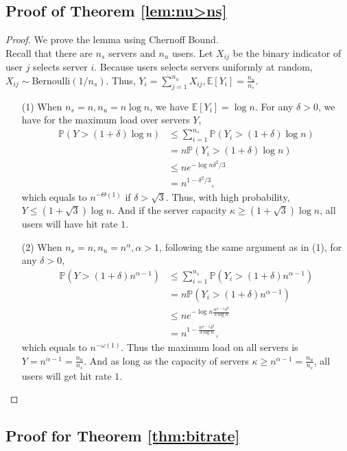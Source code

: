 \documentclass[conference]{IEEEtran}
\newcommand{\prob}[1]{\mathbb{P}\left( #1 \right)}
\newcommand{\E}[1]{\mathbb{E}\left[ #1\right]}
\begin{document}
\subsection{Proof of Theorem \ref{lem:nu>ns}}
\begin{proof}
We prove the lemma using Chernoff Bound. \\
Recall that there are $n_s$ servers and $n_u$ users. Let $X_{ij}$ be the binary indicator of user $j$ selects server $i$. Because users selects servers uniformly at random, $X_{ij}\sim \text{Bernoulli}(1/n_s)$. Thus, $Y_i=\sum_{j=1}^{n_u}X_{ij}, \E{Y_i} = \frac{n_u}{n_s}$.
\begin{enumerate}
\item [(1)] When $n_s=n, n_u=n\log n$, we have $\E{Y_i} = \log n$. For any $\delta>0$, we have for the maximum load over servers $Y$,
\begin{align*}
\prob{Y>(1+\delta)\log n} &\leq \sum_{i=1}^{n_s} \prob{Y_i>(1+\delta)\log n} \\
& = n \prob{Y_i>(1+\delta)\log n} \\
& \leq n e^{-\log n \delta^2/3} \\
& = n^{1-\delta^2/3},
\end{align*}
which equals to $n^{-\Theta(1)}$ if $\delta>\sqrt{3}$. Thus, with high probability, $Y\leq (1+\sqrt{3})\log n$. And if the server capacity $\kappa\geq (1+\sqrt{3})\log n$, all users will have hit rate $1$.
\item [(2)] When $n_s=n, n_u=n^{\alpha}, \alpha>1$, following the same argument as in (1), for any $\delta>0$,
\begin{align*}
\prob{Y>(1+\delta)n^{\alpha-1}} &\leq \sum_{i=1}^{n_s} \prob{Y_i>(1+\delta)n^{\alpha-1}} \\
& = n \prob{Y_i>(1+\delta)n^{\alpha-1}} \\
& \leq n e^{-\log n \frac{n^{\alpha-1}\delta^2}{3\log n}}\\
& = n^{1-\frac{n^{\alpha-1}\delta^2}{3\log n}},
\end{align*}
which equals to $n^{-\omega(1)}$. Thus the maximum load on all servers is $Y=n^{\alpha-1}=\frac{n_u}{n_s}$. And as long as the capacity of servers $\kappa\geq n^{\alpha-1}=\frac{n_u}{n_s}$, all users will get hit rate $1$.
\end{enumerate}
\end{proof}





\subsection{Proof for Theorem \ref{thm:bitrate}}
\end{document}
